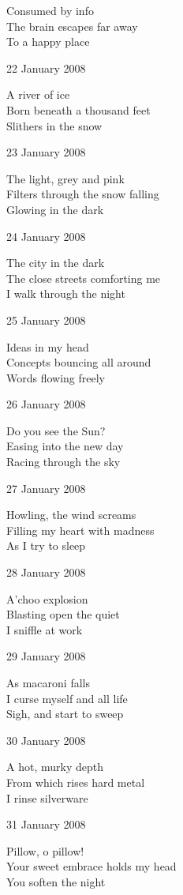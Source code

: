 \documentclass[12pt]{article}
\begin{document}
Consumed by info \\
The brain escapes far away \\
To a happy place 

22 January 2008

A river of ice \\
Born beneath a thousand feet \\
Slithers in the snow

23 January 2008

The light, grey and pink \\
Filters through the snow falling \\
Glowing in the dark

24 January 2008

The city in the dark \\
The close streets comforting me \\
I walk through the night


\newpage 

25 January 2008

Ideas in my head \\
Concepts bouncing all around \\
Words flowing freely

26 January 2008

Do you see the Sun? \\
Easing into the new day \\
Racing through the sky

27 January 2008

Howling, the wind screams \\
Filling my heart with madness \\
As I try to sleep

28 January 2008

A'choo explosion \\
Blasting open the quiet \\
I sniffle at work

29 January 2008

As macaroni falls \\
I curse myself and all life \\
Sigh, and start to sweep

30 January 2008

A hot, murky depth \\
From which rises hard metal \\
I rinse silverware 

31 January 2008

Pillow, o pillow! \\
Your sweet embrace holds my head \\
You soften the night 
\end{document}

